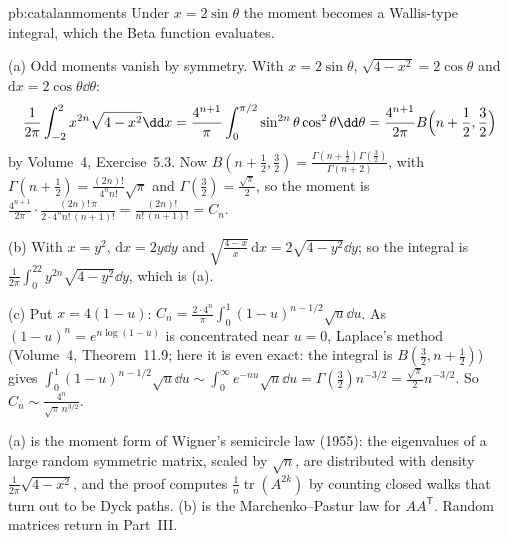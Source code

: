 \begin{solution}{pb:catalanmoments}
\idea Under $x=2\sin\theta$ the moment becomes a Wallis-type integral, which the Beta function evaluates.

\writeup (a) Odd moments vanish by symmetry. With $x=2\sin\theta$, $\sqrt{4-x^2}=2\cos\theta$ and $\mathrm dx=2\cos\theta\dd\theta$:
\[
\frac1{2\pi}\int_{-2}^2x^{2n}\sqrt{4-x^2}\dd x=\frac{4^{n+1}}{\pi}\int_0^{\pi/2}\sin^{2n}\theta\cos^2\theta\dd\theta=\frac{4^{n+1}}{2\pi}B\Bigl(n+\frac12,\frac32\Bigr)
\]
by Volume~4, Exercise~5.3. Now $B(n+\frac12,\frac32)=\frac{\Gamma(n+\frac12)\Gamma(\frac32)}{\Gamma(n+2)}$, with $\Gamma(n+\frac12)=\frac{(2n)!}{4^nn!}\sqrt\pi$ and $\Gamma(\frac32)=\frac{\sqrt\pi}2$, so
the moment is $\frac{4^{n+1}}{2\pi}\cdot\frac{(2n)!\,\pi}{2\cdot4^nn!\,(n+1)!}=\frac{(2n)!}{n!\,(n+1)!}=C_n$.

(b) With $x=y^2$, $\mathrm dx=2y\dd y$ and $\sqrt{\frac{4-x}x}\,\mathrm dx=2\sqrt{4-y^2}\dd y$; so the integral is $\frac1{2\pi}\int_0^22y^{2n}\sqrt{4-y^2}\dd y$, which is (a).

(c) Put $x=4(1-u)$: $C_n=\frac{2\cdot4^n}\pi\int_0^1(1-u)^{n-1/2}\sqrt u\dd u$. As $(1-u)^{n}=e^{n\log(1-u)}$ is concentrated near $u=0$, Laplace's method
(Volume~4, Theorem~11.9; here it is even exact: the integral is $B(\frac32,n+\frac12)$) gives $\int_0^1(1-u)^{n-1/2}\sqrt u\dd u\sim\int_0^\infty e^{-nu}\sqrt u\dd u=\Gamma(\frac32)n^{-3/2}=\frac{\sqrt\pi}2n^{-3/2}$.
So $C_n\sim\frac{4^n}{\sqrt\pi\,n^{3/2}}$.

\leads (a) is the moment form of Wigner's semicircle law (1955): the eigenvalues of a large random symmetric matrix, scaled by
$\sqrt n$, are distributed with density $\frac1{2\pi}\sqrt{4-x^2}$, and the proof computes $\frac1n\operatorname{tr}(A^{2k})$ by counting closed walks that
turn out to be Dyck paths. (b) is the Marchenko--Pastur law for $AA^{\mathsf T}$. Random matrices return in Part~III.
\end{solution}

